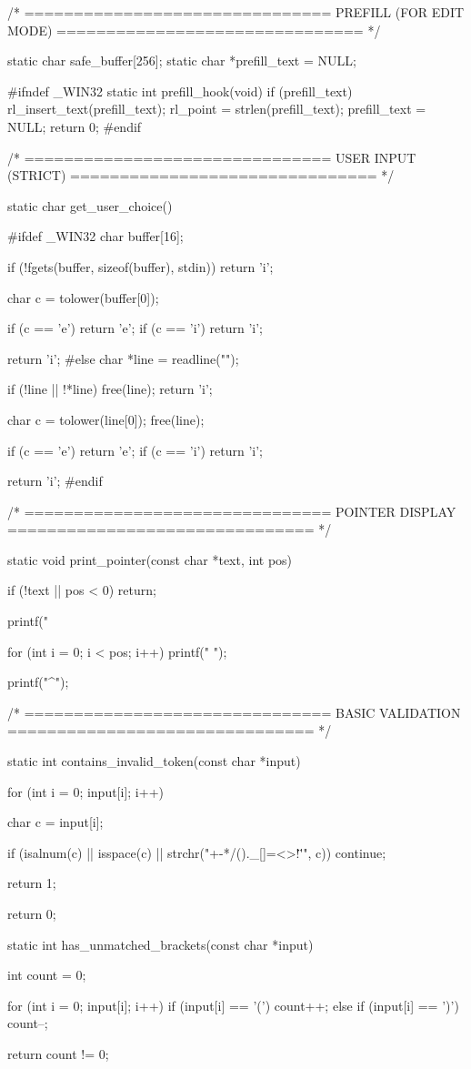 \documentclass{article}
\begin{document}
/* ===============================
   PREFILL (FOR EDIT MODE)
   =============================== */

static char safe_buffer[256];
static char *prefill_text = NULL;

#ifndef _WIN32
static int prefill_hook(void)
{
    if (prefill_text)
    {
        rl_insert_text(prefill_text);
        rl_point = strlen(prefill_text);
        prefill_text = NULL;
    }
    return 0;
}
#endif

/* ===============================
   USER INPUT (STRICT)
   =============================== */

static char get_user_choice()
{
#ifdef _WIN32
    char buffer[16];

    if (!fgets(buffer, sizeof(buffer), stdin))
        return 'i';

    char c = tolower(buffer[0]);

    if (c == 'e') return 'e';
    if (c == 'i') return 'i';

    return 'i';
#else
    char *line = readline("");

    if (!line || !*line)
    {
        free(line);
        return 'i';
    }

    char c = tolower(line[0]);
    free(line);

    if (c == 'e') return 'e';
    if (c == 'i') return 'i';

    return 'i';
#endif
}

/* ===============================
   POINTER DISPLAY
   =============================== */

static void print_pointer(const char *text, int pos)
{
    if (!text || pos < 0) return;

    printf("%

    for (int i = 0; i < pos; i++)
        printf(" ");

    printf("^\n\n");
}

/* ===============================
   BASIC VALIDATION
   =============================== */

static int contains_invalid_token(const char *input)
{
    for (int i = 0; input[i]; i++)
    {
        char c = input[i];

        if (isalnum(c) || isspace(c) || strchr("+-*/()._{}[]=<>!\"'", c))
            continue;

        return 1;
    }
    return 0;
}

static int has_unmatched_brackets(const char *input)
{
    int count = 0;

    for (int i = 0; input[i]; i++)
    {
        if (input[i] == '(') count++;
        else if (input[i] == ')') count--;
    }

    return count != 0;
}
\end{document}
